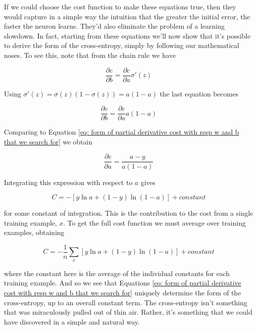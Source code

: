 \documentclass[a4paper,11pt,twoside]{report}
\begin{document}
If we could choose the cost function to make these equations true, then they would capture in a simple way the intuition that the greater the initial error, the faster the neuron learns. They'd also eliminate the problem of a learning slowdown. In fact, starting from these equations we'll now show that it's possible to derive the form of the cross-entropy, simply by following our mathematical noses. To see this, note that from the chain rule we have

\begin{equation}
\frac{\partial c}{\partial b}=\frac{\partial c}{\partial a}\sigma'(z)
\label{eq: partial derivative in terms of sigmoid derivative}
\end{equation}

Using $\sigma'(z)=\sigma(z)(1-\sigma(z))=a(1-a)$ the last equation becomes

\begin{equation}
\frac{\partial c}{\partial b}=\frac{\partial c}{\partial a}a(1-a)
\label{eq: partial derivative in terms of activation}
\end{equation}

Comparing to Equation \ref{eq: form of partial derivative cost with resp w and b that we search for} we obtain

\begin{equation}
\frac{\partial c}{\partial a}=\frac{a-y}{a(1-a)}
\label{eq: partial derivative with resect to a in terms of activation}
\end{equation}

Integrating this expression with respect to $a$ gives

\begin{equation}
C=-[y \ln a+(1-y)\ln(1-a)]+constant
\label{eq: integration of C with respect to a}
\end{equation}

for some constant of integration. This is the contribution to the cost from a single training example, $x$. To get the full cost function we must average over training examples, obtaining

\begin{equation}
C=-\frac{1}{n}\sum_x[y \ln a+(1-y)\ln(1-a)]+constant
\label{eq: derived form for multiple training examples of cross-entropy}
\end{equation}

where the constant here is the average of the individual constants for each training example. And so we see that Equations \ref{eq: form of partial derivative cost with resp w and b that we search for} uniquely determine the form of the cross-entropy, up to an overall constant term. The cross-entropy isn't something that was miraculously pulled out of thin air. Rather, it's something that we could have discovered in a simple and natural way.\\
\end{document}
